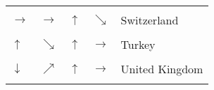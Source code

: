 \begin{table}[!h]
\begin{tabular}[t]{lllll}
\addlinespace
\cellcolor{gray!6}{$\rightarrow$} & \cellcolor{gray!6}{$\rightarrow$} & \cellcolor{gray!6}{$\uparrow$} & \cellcolor{gray!6}{$\searrow$} & \cellcolor{gray!6}{Spain}\\
$\rightarrow$ & $\rightarrow$ & $\uparrow$ & $\searrow$ & Switzerland\\
\cellcolor{gray!6}{$\rightarrow$} & \cellcolor{gray!6}{$\nearrow$} & \cellcolor{gray!6}{$\rightarrow$} & \cellcolor{gray!6}{$\rightarrow$} & \cellcolor{gray!6}{Taiwan}\\
$\uparrow$ & $\searrow$ & $\uparrow$ & $\rightarrow$ & Turkey\\
\cellcolor{gray!6}{$\rightarrow$} & \cellcolor{gray!6}{$\rightarrow$} & \cellcolor{gray!6}{$\uparrow$} & \cellcolor{gray!6}{$\searrow$} & \cellcolor{gray!6}{Ukraine}\\
\addlinespace
$\downarrow$ & $\nearrow$ & $\uparrow$ & $\rightarrow$ & United Kingdom\\
\cellcolor{gray!6}{$\rightarrow$} & \cellcolor{gray!6}{$\searrow$} & \cellcolor{gray!6}{$\uparrow$} & \cellcolor{gray!6}{$\rightarrow$} & \cellcolor{gray!6}{United States}\\
\bottomrule
\end{tabular}
\end{table}
